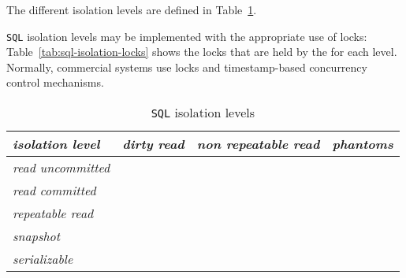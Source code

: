 \documentclass[english]{article}
\begin{document}
The different isolation levels are defined in Table~\ref{tab:sql-isolation-levels}.

\bigskip
\texttt{SQL} isolation levels may be implemented with the appropriate use of locks: Table~\ref{tab:sql-isolation-locks} shows the locks that are held by the \dbms for each level.
Normally, commercial systems use locks and timestamp-based concurrency control mechanisms.

\begin{table}[htbp]
  \centering
  \bigskip
  \begin{tabular}{l|c|c|c}
    \textit{isolation level}  & \textit{dirty read} & \textit{non repeatable read} & \textit{phantoms} \\
    \hline
    \textit{read uncommitted} &          &                   &        \\
    \textit{read committed}   &          &                   &        \\
    \textit{repeatable read}  &          &                   &        \\
    \textit{snapshot}         &          &                   &        \\
    \textit{serializable}     &          &                   &        \\
  \end{tabular}
  \caption{\texttt{SQL} isolation levels}
  \label{tab:sql-isolation-levels}
  \bigskip
\end{table}

\begin{sidewaystable}[htbp]
  \centering
  \bigskip
  \caption{\texttt{SQL} isolation levels and locks}
  \label{tab:sql-isolation-locks}
\end{sidewaystable}
\end{document}
